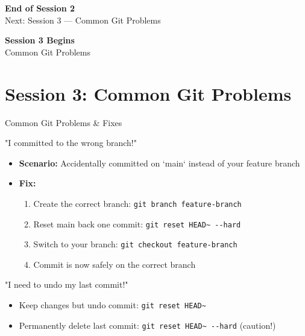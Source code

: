 \documentclass[aspectratio=169]{beamer}
\begin{document}
\begin{frame}
  \centering
  \Huge{\textbf{End of Session 2}}\\[0.5em]
  \large{Next: Session 3 — Common Git Problems}
\end{frame}

\begin{frame}
  \centering
  \Huge{\textbf{Session 3 Begins}}\\[0.5em]
  \large{Common Git Problems}
\end{frame}

\section{Session 3: Common Git Problems}

\begin{frame}[fragile]{Common Git Problems \& Fixes}
  \begin{block}{"I committed to the wrong branch!"}
    \begin{itemize}
        \item \textbf{Scenario:} Accidentally committed on `main` instead of your feature branch
        \item \textbf{Fix:}
        \begin{enumerate}
            \item Create the correct branch: \verb|git branch feature-branch|
            \item Reset main back one commit: \verb|git reset HEAD~ --hard|
            \item Switch to your branch: \verb|git checkout feature-branch|
            \item Commit is now safely on the correct branch
        \end{enumerate}
    \end{itemize}
  \end{block}

  \begin{alertblock}{"I need to undo my last commit!"}
     \begin{itemize}
         \item Keep changes but undo commit: \verb|git reset HEAD~|
         \item Permanently delete last commit: \verb|git reset HEAD~ --hard| (caution!)
     \end{itemize}
  \end{alertblock}
\end{frame}
\end{document}

